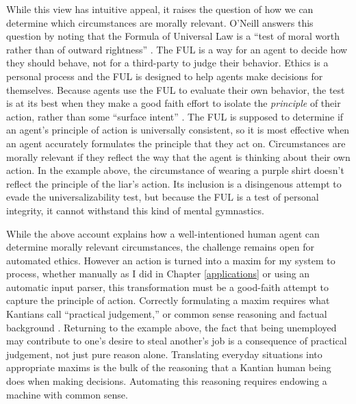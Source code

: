 \begin{isabellebody}
\begin{isamarkuptext}
While this view has intuitive appeal, it raises the question of how we can determine
which circumstances are morally relevant. O'Neill answers this question by noting that the Formula of Universal Law is 
a ``test of moral worth rather than of outward rightness'' \citep[98]{constofreason}. The FUL is a way 
for an agent to decide how they should behave, not for a third-party to judge their behavior. Ethics is 
a personal process and the FUL is designed to help agents make decisions for themselves. Because agents use 
the FUL to evaluate their own behavior, the test is at its 
best when they make a good faith effort to isolate the \emph{principle} of their action, rather than some
``surface intent'' \citep[87]{constofreason}. The FUL is supposed to determine if an agent's principle of action
is universally consistent, so it is most effective when an agent accurately formulates the principle that
they act on. Circumstances are morally relevant if they reflect the way that the agent is 
thinking about their own action. In the example above, the circumstance of wearing a purple shirt doesn't reflect
the principle of the liar's action. Its inclusion is a disingenous attempt to evade the universalizability
test, but because the FUL is a test of personal integrity, it cannot withstand this kind of mental
gymnastics. 
 
While the above account explains how a well-intentioned human agent can determine 
morally relevant circumstances, the challenge remains open for automated ethics. However an action is turned into a maxim for my system 
to process, whether manually as I did in Chapter \ref{applications} or using an automatic input 
parser, this transformation must be a good-faith attempt to capture the principle of action. 
Correctly formulating a maxim requires what Kantians call ``practical judgement,'' or
common sense reasoning and factual background \citep{oneilluniversallaws}. Returning to the example above, the fact that being 
unemployed may contribute to one's desire to steal another's job is a consequence of practical
judgement, not just pure reason alone. Translating everyday situations into appropriate maxims is
the bulk of the reasoning that a Kantian human being does when making decisions. Automating this
reasoning requires endowing a machine with common sense. 


\end{isamarkuptext}
\end{isabellebody}

